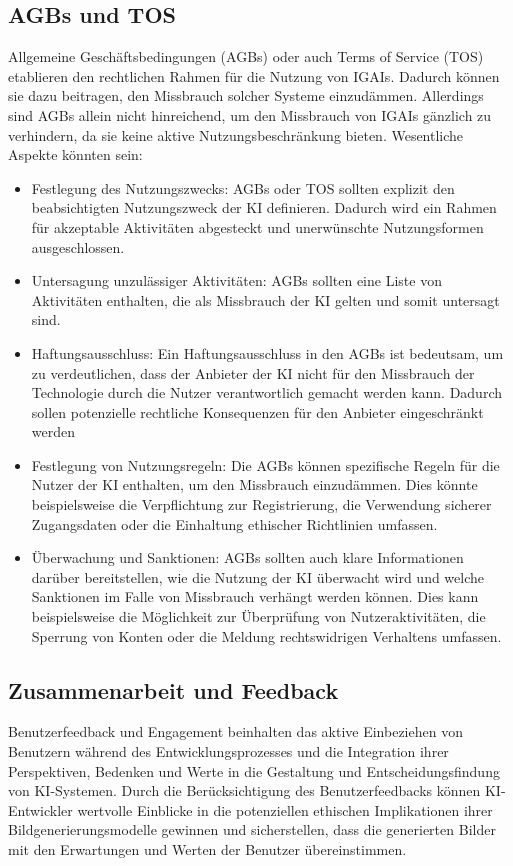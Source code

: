 \documentclass[12pt]{article}
\begin{document}
\subsection{AGBs und TOS}
Allgemeine Geschäftsbedingungen (AGBs) oder auch Terms of Service (TOS) etablieren den rechtlichen Rahmen für die Nutzung von IGAIs. Dadurch können sie dazu beitragen, den Missbrauch solcher Systeme einzudämmen. 
Allerdings sind AGBs allein nicht hinreichend, um den Missbrauch von IGAIs gänzlich zu verhindern, da sie keine aktive Nutzungsbeschränkung bieten. Wesentliche Aspekte könnten sein:
\begin{itemize}
    \item Festlegung des Nutzungszwecks: AGBs oder TOS sollten explizit den beabsichtigten Nutzungszweck der KI definieren. Dadurch wird ein Rahmen für akzeptable Aktivitäten abgesteckt und unerwünschte Nutzungsformen ausgeschlossen.
    \item Untersagung unzulässiger Aktivitäten: AGBs sollten eine Liste von Aktivitäten enthalten, die als Missbrauch der KI gelten und somit untersagt sind.
    \item Haftungsausschluss: Ein Haftungsausschluss in den AGBs ist bedeutsam, um zu verdeutlichen, dass der Anbieter der KI nicht für den Missbrauch der Technologie durch die Nutzer verantwortlich gemacht werden kann. Dadurch sollen potenzielle rechtliche Konsequenzen für den Anbieter eingeschränkt werden
    \item Festlegung von Nutzungsregeln: Die AGBs  können spezifische Regeln für die Nutzer der KI enthalten, um den Missbrauch einzudämmen. Dies könnte beispielsweise die Verpflichtung zur Registrierung, die Verwendung sicherer Zugangsdaten oder die Einhaltung ethischer Richtlinien umfassen.
    \item Überwachung und Sanktionen: AGBs sollten auch klare Informationen darüber bereitstellen, wie die Nutzung der KI überwacht wird und welche Sanktionen im Falle von Missbrauch verhängt werden können. Dies kann beispielsweise die Möglichkeit zur Überprüfung von Nutzeraktivitäten, die Sperrung von Konten oder die Meldung rechtswidrigen Verhaltens umfassen.
\end{itemize}

\subsection{Zusammenarbeit und Feedback}
Benutzerfeedback und Engagement beinhalten das aktive Einbeziehen von Benutzern während des Entwicklungsprozesses und die Integration ihrer Perspektiven, Bedenken und Werte in die Gestaltung und Entscheidungsfindung von KI-Systemen. Durch die Berücksichtigung des Benutzerfeedbacks können KI-Entwickler wertvolle Einblicke in die potenziellen ethischen Implikationen ihrer Bildgenerierungsmodelle gewinnen und sicherstellen, dass die generierten Bilder mit den Erwartungen und Werten der Benutzer übereinstimmen.
\end{document}
